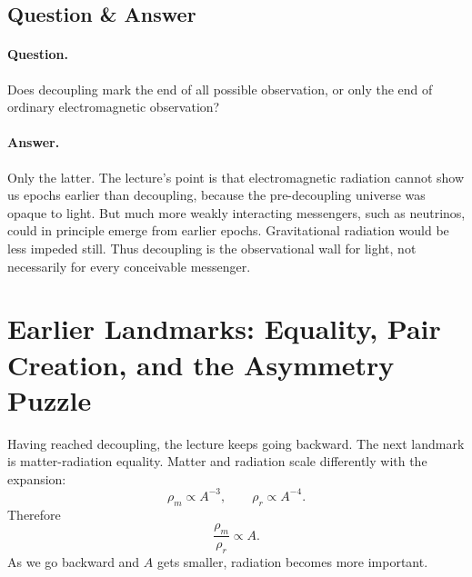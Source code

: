 \subsection{Question \& Answer}

\paragraph{Question.} Does decoupling mark the end of all possible observation, or only the end of ordinary electromagnetic observation?

\paragraph{Answer.} Only the latter. The lecture's point is that electromagnetic radiation cannot show us epochs earlier than decoupling, because the pre-decoupling universe was opaque to light. But much more weakly interacting messengers, such as neutrinos, could in principle emerge from earlier epochs. Gravitational radiation would be less impeded still. Thus decoupling is the observational wall for light, not necessarily for every conceivable messenger.

\section{Earlier Landmarks: Equality, Pair Creation, and the Asymmetry Puzzle}

Having reached decoupling, the lecture keeps going backward. The next landmark is matter-radiation equality. Matter and radiation scale differently with the expansion:
\begin{equation}
\rho_m \propto A^{-3},
\qquad
\rho_r \propto A^{-4}.
\end{equation}
Therefore
\begin{equation}
\frac{\rho_m}{\rho_r} \propto A.
\end{equation}
As we go backward and \(A\) gets smaller, radiation becomes more important.

